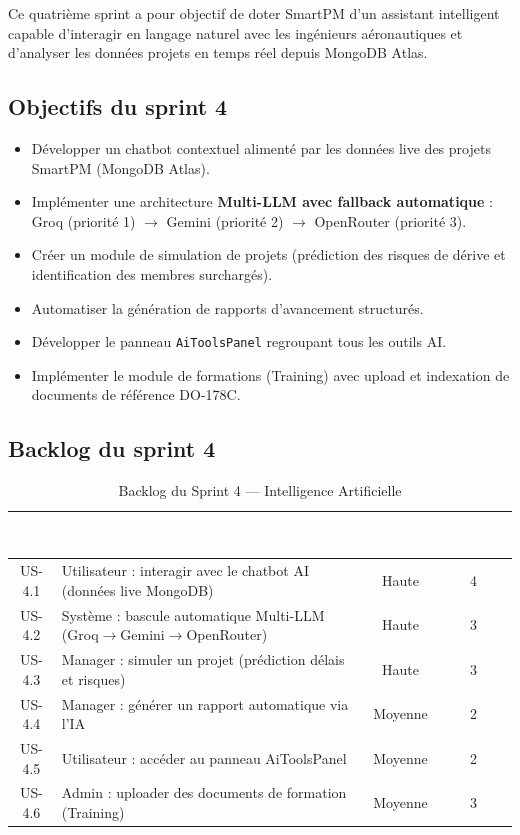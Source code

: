 Ce quatri\`eme sprint a pour objectif de doter SmartPM d'un assistant
intelligent capable d'interagir en langage naturel avec les ing\'enieurs
a\'eronautiques et d'analyser les donn\'ees projets en temps r\'eel depuis
MongoDB Atlas.

\subsection{Objectifs du sprint 4}

\begin{itemize}
  \item D\'evelopper un chatbot contextuel aliment\'e par les donn\'ees live
        des projets SmartPM (MongoDB Atlas).
  \item Impl\'ementer une architecture \textbf{Multi-LLM avec fallback automatique} :
        Groq (priorit\'e 1) $\rightarrow$ Gemini (priorit\'e 2)
        $\rightarrow$ OpenRouter (priorit\'e 3).
  \item Cr\'eer un module de simulation de projets (pr\'ediction des risques
        de d\'erive et identification des membres surcharg\'es).
  \item Automatiser la g\'en\'eration de rapports d'avancement structur\'es.
  \item D\'evelopper le panneau \texttt{AiToolsPanel} regroupant tous les outils AI.
  \item Impl\'ementer le module de formations (Training) avec upload et
        indexation de documents de r\'ef\'erence DO-178C.
\end{itemize}

\subsection{Backlog du sprint 4}

\begin{table}[H]
\centering
\renewcommand{\arraystretch}{1.4}
\begin{tabularx}{\textwidth}{|c|X|c|c|}
\hline
\rowcolor{tablehead}
\textcolor{white}{\textbf{ID}} &
\textcolor{white}{\textbf{User Story}} &
\textcolor{white}{\textbf{Priorit\'e}} &
\textcolor{white}{\textbf{Charge (j)}} \\ \hline
US-4.1 & Utilisateur : interagir avec le chatbot AI (donn\'ees live MongoDB) & Haute & 4 \\ \hline
US-4.2 & Syst\`eme : bascule automatique Multi-LLM (Groq$\to$Gemini$\to$OpenRouter) & Haute & 3 \\ \hline
US-4.3 & Manager : simuler un projet (pr\'ediction d\'elais et risques) & Haute & 3 \\ \hline
US-4.4 & Manager : g\'en\'erer un rapport automatique via l'IA & Moyenne & 2 \\ \hline
US-4.5 & Utilisateur : acc\'eder au panneau AiToolsPanel & Moyenne & 2 \\ \hline
US-4.6 & Admin : uploader des documents de formation (Training) & Moyenne & 3 \\ \hline
\end{tabularx}
\caption{Backlog du Sprint 4 --- Intelligence Artificielle}
\label{tab:backlog_s4}
\end{table}

